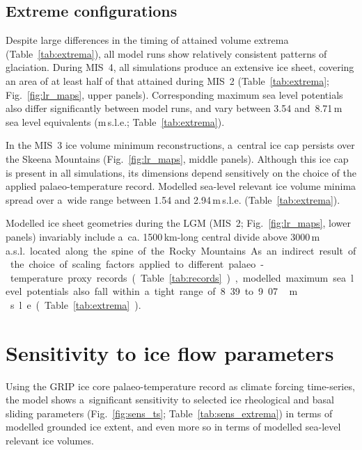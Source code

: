 \documentclass[tc, manuscript]{copernicus}
\begin{document}
\subsection{Extreme configurations}

      Despite large differences in the timing of attained volume extrema
      (Table~\ref{tab:extrema}), all model runs show relatively consistent
      patterns of glaciation. During MIS~4, all simulations produce an
      extensive ice sheet, covering an area of at least half of that
      attained during MIS~2 (Table~\ref{tab:extrema};
      Fig.~\ref{fig:lr_maps}, upper panels). Corresponding maximum sea level
      potentials
      also differ significantly between model runs, and vary between
      3.54 and~8.71\,\unit{m} sea level equivalents (m\,s.l.e.;
      Table~\ref{tab:extrema}).

      In the MIS~3 ice volume minimum reconstructions, a~central ice cap
      persists over the Skeena Mountains (Fig.~\ref{fig:lr_maps}, middle
      panels). Although this ice cap is present in all simulations, its
      dimensions depend sensitively on the choice of the applied
      palaeo-temperature record. Modelled sea-level relevant ice volume
      minima spread over
      a~wide range between 1.54 and 2.94\,\unit{m}\,s.l.e.
      (Table~\ref{tab:extrema}).

      Modelled ice sheet geometries during the LGM (MIS~2;
      Fig.~\ref{fig:lr_maps}, lower panels) invariably include a~ca.
      1500\,\unit{km}-long central divide above 3000\,\unit{m\,a.s.l.}
      located along the spine of the Rocky Mountains. As an indirect result
      of the choice of scaling factors applied to different
      palaeo-temperature proxy records (Table~\ref{tab:records}), modelled
      maximum sea level potentials also fall within a~tight range of 8.39 to
      9.07\,\unit{m}\,s.l.e. (Table~\ref{tab:extrema}).


\section{Sensitivity to ice flow parameters}
\label{sec:sens}

      Using the GRIP ice core palaeo-temperature record as climate forcing
      time-series, the model shows a~significant sensitivity to selected ice
      rheological and basal sliding parameters (Fig.~\ref{fig:sens_ts};
      Table~\ref{tab:sens_extrema}) in terms of modelled grounded ice
      extent, and even more so in terms of modelled sea-level relevant ice
      volumes.
\end{document}
